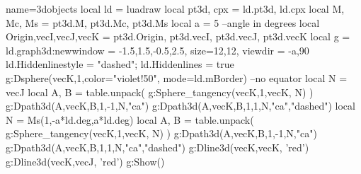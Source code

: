 \documentclass{standalone}
\begin{document}
\begin{luadraw}{name=3dobjects}
local ld = luadraw
local pt3d, cpx = ld.pt3d, ld.cpx
local M, Mc, Ms = pt3d.M, pt3d.Mc, pt3d.Ms
local a = 5 --angle in degrees
local Origin,vecI,vecJ,vecK = pt3d.Origin, pt3d.vecI, pt3d.vecJ, pt3d.vecK
local g = ld.graph3d:new{window = {-1.5,1.5,-0.5,2.5}, size={12,12}, viewdir = {-a,90}}
ld.Hiddenlinestyle = "dashed"; ld.Hiddenlines = true
g:Dsphere(vecK,1,{color="violet!50", mode=ld.mBorder})  --no equator
local N = vecJ
local A, B = table.unpack( g:Sphere_tangency(vecK,1,{vecK, N}) )
g:Dpath3d({A,vecK,B,1,-1,N,"ca"})
g:Dpath3d({A,vecK,B,1,1,N,"ca"},"dashed")
local N = Ms(1,-a*ld.deg,a*ld.deg)
local A, B = table.unpack( g:Sphere_tangency(vecK,1,{vecK, N}) )
g:Dpath3d({A,vecK,B,1,-1,N,"ca"})
g:Dpath3d({A,vecK,B,1,1,N,"ca"},"dashed")
g:Dline3d({vecK,vecK}, 'red')
g:Dline3d({vecK,vecJ}, 'red')
g:Show()
\end{luadraw}
\end{document}
